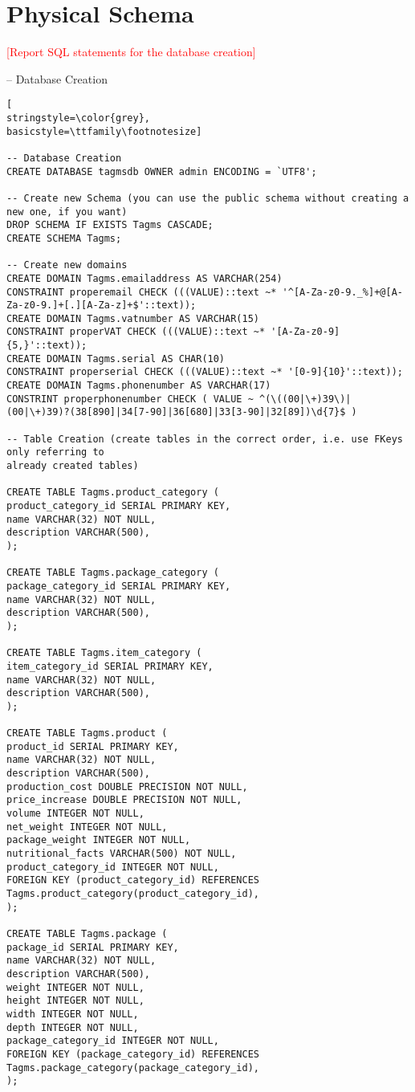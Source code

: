 \section{Physical Schema}
\textcolor{red}{[Report SQL statements for the database creation]}

-- Database Creation
\begin{lstlisting}[
stringstyle=\color{grey},
basicstyle=\ttfamily\footnotesize]

-- Database Creation
CREATE DATABASE tagmsdb OWNER admin ENCODING = `UTF8';

-- Create new Schema (you can use the public schema without creating a new one, if you want)
DROP SCHEMA IF EXISTS Tagms CASCADE;
CREATE SCHEMA Tagms;

-- Create new domains
CREATE DOMAIN Tagms.emailaddress AS VARCHAR(254)
CONSTRAINT properemail CHECK (((VALUE)::text ~* '^[A-Za-z0-9._%]+@[A-Za-z0-9.]+[.][A-Za-z]+$'::text));
CREATE DOMAIN Tagms.vatnumber AS VARCHAR(15)
CONSTRAINT properVAT CHECK (((VALUE)::text ~* '[A-Za-z0-9]{5,}'::text));
CREATE DOMAIN Tagms.serial AS CHAR(10)
CONSTRAINT properserial CHECK (((VALUE)::text ~* '[0-9]{10}'::text));
CREATE DOMAIN Tagms.phonenumber AS VARCHAR(17)
CONSTRINT properphonenumber CHECK ( VALUE ~ ^(\((00|\+)39\)|(00|\+)39)?(38[890]|34[7-90]|36[680]|33[3-90]|32[89])\d{7}$ )

-- Table Creation (create tables in the correct order, i.e. use FKeys only referring to
already created tables)

CREATE TABLE Tagms.product_category (
product_category_id SERIAL PRIMARY KEY,
name VARCHAR(32) NOT NULL,
description VARCHAR(500),
);

CREATE TABLE Tagms.package_category (
package_category_id SERIAL PRIMARY KEY,
name VARCHAR(32) NOT NULL,
description VARCHAR(500),
);

CREATE TABLE Tagms.item_category (
item_category_id SERIAL PRIMARY KEY,
name VARCHAR(32) NOT NULL,
description VARCHAR(500),
);

CREATE TABLE Tagms.product (
product_id SERIAL PRIMARY KEY,
name VARCHAR(32) NOT NULL,
description VARCHAR(500),
production_cost DOUBLE PRECISION NOT NULL,
price_increase DOUBLE PRECISION NOT NULL,
volume INTEGER NOT NULL,
net_weight INTEGER NOT NULL,
package_weight INTEGER NOT NULL,
nutritional_facts VARCHAR(500) NOT NULL,
product_category_id INTEGER NOT NULL,
FOREIGN KEY (product_category_id) REFERENCES Tagms.product_category(product_category_id),
);

CREATE TABLE Tagms.package (
package_id SERIAL PRIMARY KEY,
name VARCHAR(32) NOT NULL,
description VARCHAR(500),
weight INTEGER NOT NULL,
height INTEGER NOT NULL,
width INTEGER NOT NULL,
depth INTEGER NOT NULL,
package_category_id INTEGER NOT NULL,
FOREIGN KEY (package_category_id) REFERENCES Tagms.package_category(package_category_id),
);


\end{lstlisting}
